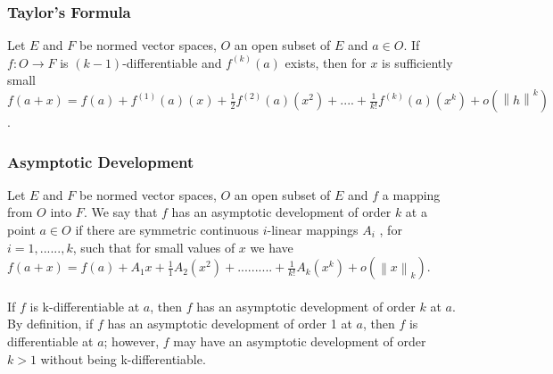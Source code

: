 \documentclass{beamer}
\newcommand\norm[1]{\left\lVert#1\right\rVert}
\begin{document}
\begin{frame}
\frametitle{Taylor's Formula}

Let $E$ and $F$ be normed vector spaces, $O$ an open subset of $E$ and $a \in O$. If $f: O \to F$ is $(k-1)$-differentiable and $f^{(k)}(a)$ exists, then for $x$ is sufficiently small \\
\qquad $ f(a+x) = f(a)  + f^{(1)}(a)(x) + \frac{1}{2} f^{(2)}(a)(x^2) +....+\frac{1}{k!} f^{(k)}(a)(x^k) + o(\norm{h}^k)$.


\end{frame}

\begin{frame}
\frametitle{Asymptotic Development}
Let $E$ and $F$ be normed vector spaces, $O$ an open subset of $E$ and $f$ a mapping from $O$ into $F$. We say that $f$ has an asymptotic development of order $k$ at a point $a \in O$ if there are symmetric continuous $i$-linear mappings $A_i$ , for $i = 1,......,k$,
such that for small values of $x$ we have\\

\hspace{2cm} $f(a+x) = f(a) + A_1x + \frac{1}{1}A_2(x^2)+..........+ \frac{1}{k!}A_k(x^k) + o(\norm{x}_k)$.\\~\\

If $f$ is k-differentiable at $a$, then $f$ has an asymptotic development of order $k$ at $a$. By definition, if $f$ has an asymptotic development of order 1 at $a$, then $f$ is differentiable at $a$; however, $f$ may have an asymptotic development of order $k > 1$ without being k-differentiable.



\end{frame}
\end{document}

